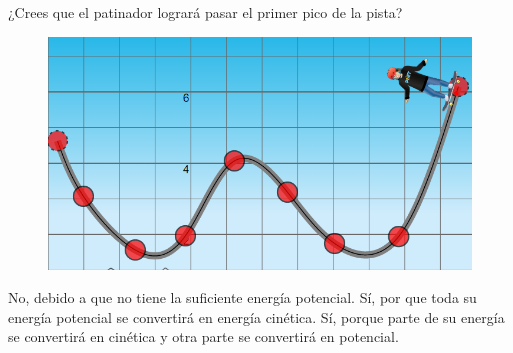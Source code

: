 ¿Crees que el patinador logrará pasar el primer pico de la pista?

\begin{minipage}{0.3\textwidth}
    \begin{figure}[H]
        \includegraphics[width=\linewidth]{../images/q028b}
    \end{figure}
\end{minipage}\hfill
\begin{minipage}{0.6\textwidth}
    \begin{choices}
        \choice No, debido a que no tiene la suficiente energía potencial.
        \choice Sí, por que toda su energía potencial se convertirá en energía cinética.
        \choice Sí, porque parte de su energía se convertirá en cinética y otra parte se convertirá en potencial.
    \end{choices}
\end{minipage}
